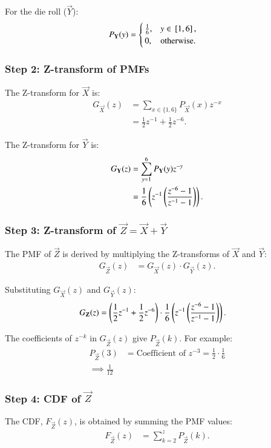 \documentclass[journal]{IEEEtran}
\begin{document}
For the die roll ($\vec{Y}$):
\begin{align}
P_{\mathbf{Y}}(y) &= 
\begin{cases} 
\frac{1}{6}, & y \in {}\left[1,6\right], \\
0, & \text{otherwise}.
\end{cases}
\end{align}

\subsubsection*{Step 2: Z-transform of PMFs}
The Z-transform for $\vec{X}$ is:
\begin{align}
G_{\vec{X}}(z) &= \sum_{x \in \{1, 6\}} P_{\vec{X}}(x) z^{-x} \\
     &= \frac{1}{2} z^{-1} + \frac{1}{2} z^{-6}.
\end{align}

The Z-transform for $\vec{Y}$ is:
\begin{align}
G_{\mathbf{Y}}(z) &= \sum_{y=1}^{6} P_{\mathbf{Y}}(y) z^{-y} \\
     &= \frac{1}{6} \left(z^{-1}\left(\frac{z^{-6}-1}{z^{-1}-1}\right)\right).
\end{align}

\subsubsection*{Step 3: Z-transform of $\vec{Z} = \vec{X} + \vec{Y}$}
The PMF of $\vec{Z}$ is derived by multiplying the Z-transforms of $\vec{X}$ and $\vec{Y}$:
\begin{align}
G_{\vec{Z}}(z) &= G_{\vec{X}}(z) \cdot G_{\vec{Y}}(z).
\end{align}

Substituting $G_{\vec{X}}(z)$ and $G_{\vec{Y}}(z)$:
\begin{align}
G_{\mathbf{Z}}(z) &= \left(\frac{1}{2} z^{-1} + \frac{1}{2} z^{-6}\right) \cdot \frac{1}{6} \left(z^{-1}\left(\frac{z^{-6}-1}{z^{-1}-1}\right)\right).
\end{align}



The coefficients of $z^{-k}$ in $G_{\vec{Z}}(z)$ give $P_{\vec{Z}}(k)$. For example:
\begin{align}
P_{\vec{Z}}(3) &= \text{Coefficient of } z^{-3} = \frac{1}{2} \cdot \frac{1}{6}\\
\implies \frac{1}{12}
\end{align}

\subsubsection*{Step 4: CDF of $\vec{Z}$}
The CDF, $F_{\vec{Z}}(z)$, is obtained by summing the PMF values:
\begin{align}
F_{\vec{Z}}(z) &= \sum_{k=2}^{z} P_{\vec{Z}}(k).
\end{align}
\end{document}

